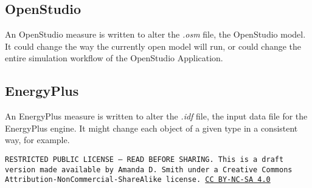 \documentclass[10pt]{article}
\begin{document}
\subsection{OpenStudio}

An OpenStudio measure is written to alter the \textit{.osm} file, the OpenStudio model. It could change the way the currently open model will run, or could change the entire simulation workflow of the OpenStudio Application.


\subsection{EnergyPlus}

An EnergyPlus measure is written to alter the \textit{.idf} file, the input data file for the EnergyPlus engine. It might change each object of a given type in a consistent way, for example.

\bigskip

\noindent
\texttt{\footnotesize RESTRICTED PUBLIC LICENSE --- READ BEFORE SHARING. This is a draft version made available by Amanda D. Smith under a Creative Commons Attribution-NonCommercial-ShareAlike license. 
\href{https://creativecommons.org/licenses/by-nc-sa/4.0/}{CC BY-NC-SA 4.0}}

\newpage
\printbibliography
\end{document}
